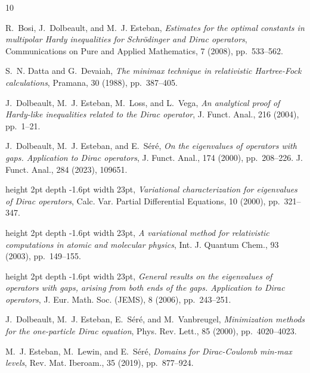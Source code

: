 \documentclass[12pt,reqno]{amsart}
\renewcommand{\(}{\left(}
\renewcommand{\)}{\right)}
\begin{document}
\small
\begin{thebibliography}{10}

{\sc R.~Bosi, J.~Dolbeault, and M.~J. Esteban}, {\em {Estimates for the optimal
  constants in multipolar Hardy inequalities for Schr{\"o}dinger and Dirac
  operators}}, {Communications on Pure and Applied Mathematics}, 7 (2008),
  pp.~533--562.

{\sc S.~N. Datta and G.~Devaiah}, {\em The minimax technique in relativistic
  {H}artree-{F}ock calculations}, Pramana, 30 (1988), pp.~387--405.

{\sc J.~Dolbeault, M.~J. Esteban, M.~Loss, and L.~Vega}, {\em An analytical
  proof of {H}ardy-like inequalities related to the {D}irac operator}, J.
  Funct. Anal., 216 (2004), pp.~1--21.

{\sc J.~Dolbeault, M.~J. Esteban, and E.~S\'{e}r\'{e}}, {\em On the eigenvalues
  of operators with gaps. {A}pplication to {D}irac operators}, J. Funct. Anal.,
  174 (2000), pp.~208--226.
 J. Funct. Anal., 284 (2023), 109651.

\leavevmode\vrule height 2pt depth -1.6pt width 23pt, {\em Variational
  characterization for eigenvalues of {D}irac operators}, Calc. Var. Partial
  Differential Equations, 10 (2000), pp.~321--347.

\leavevmode\vrule height 2pt depth -1.6pt width 23pt, {\em A variational method
  for relativistic computations in atomic and molecular physics}, Int. J.
  Quantum Chem., 93 (2003), pp.~149--155.

\leavevmode\vrule height 2pt depth -1.6pt width 23pt, {\em General results on
  the eigenvalues of operators with gaps, arising from both ends of the gaps.
  {A}pplication to {D}irac operators}, J. Eur. Math. Soc. (JEMS), 8 (2006),
  pp.~243--251.

{\sc J.~Dolbeault, M.~J. Esteban, E.~S{\'e}r{\'e}, and M.~Vanbreugel}, {\em
  Minimization methods for the one-particle {D}irac equation}, Phys. Rev.
  Lett., 85 (2000), pp.~4020--4023.

{\sc M.~J. Esteban, M.~Lewin, and E.~S\'{e}r\'{e}}, {\em Domains for
  {D}irac-{C}oulomb min-max levels}, Rev. Mat. Iberoam., 35 (2019),
  pp.~877--924.


\end{thebibliography}
\end{document}
